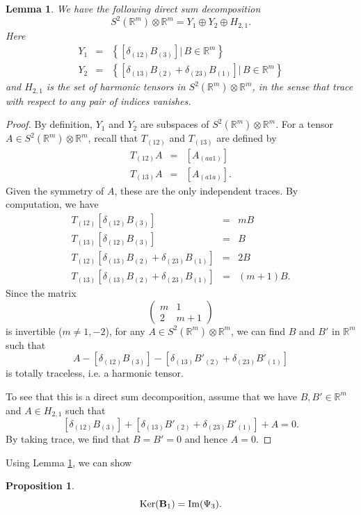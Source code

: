 \documentclass{amsart}
\newtheorem{lem}[thm]{Lemma}
\newtheorem{prop}[thm]{Proposition}
\newcommand{\set}[1]{\left\{#1\right\}}
\newcommand{\Real}{\mathbb R}
\numberwithin{equation}{section}
\begin{document}
\begin{lem}\label{lem:decom_21}
	We have the following direct sum decomposition
	\[
		S^2(\Real^m)\otimes \Real^m= Y_1 \oplus Y_2\oplus H_{2,1}.
	\]
	Here
	\begin{eqnarray*}
		Y_1&=& \set{[ \delta_{(12)}B_{(3)}] |\, B\in \Real^m}\\
		Y_2&=& \set{[\delta_{(13)}B_{(2)}+\delta_{(23)}B_{(1)}]|\, B\in \Real^m}
	\end{eqnarray*}
	and $H_{2,1}$ is the set of harmonic tensors in $S^2(\Real^m)\otimes \Real^m$, in the sense that trace with respect to any pair of indices vanishes.
\end{lem}
\begin{proof}
	By definition, $Y_1$ and $Y_2$ are subspaces of $S^2(\Real^m)\otimes \Real^m$.
	For a tensor $A\in S^2(\Real^m)\otimes \Real^m$, recall that $T_{(12)}$ and $T_{(13)}$ are defined by
	\begin{eqnarray*}
		T_{(12)}A &=& [A_{(aa1)}]  \\
		T_{(13)}A &=& [A_{(a1a)}] .
	\end{eqnarray*}
	Given the symmetry of $A$, these are the only independent traces. By computation, we have	
	\begin{eqnarray*}
		T_{(12)}[\delta_{(12)}B_{(3)}] &=& m B \\
		T_{(13)}[\delta_{(12)}B_{(3)}] &=& B \\
		T_{(12)}[\delta_{(13)}B_{(2)}+ \delta_{(23)}B_{(1)}] &=& 2B \\
		T_{(13)}[\delta_{(13)}B_{(2)}+ \delta_{(23)}B_{(1)}] &=& (m+1)B.
	\end{eqnarray*}
	Since the matrix
	\[
		\left(
			\begin{array}{cc}
				m & 1\\
				2 & m+1
			\end{array}
		\right)
	\]
	is invertible ($m\ne 1,-2$), for any $A\in S^2(\Real^m)\otimes \Real^m$, we can find $B$ and $B'$ in $\Real^m$ such that
	\[
		A- [\delta_{(12)}B_{(3)}] - [\delta_{(13)}B'_{(2)}+ \delta_{(23)}B'_{(1)}]
	\]
	is totally traceless, i.e. a harmonic tensor. 

	To see that this is a direct sum decomposition, assume that we have $B,B'\in \Real^m$ and $A\in H_{2,1}$ such that
	$$
	[\delta_{(12)}B_{(3)}] + [\delta_{(13)}B'_{(2)}+\delta_{(23)}B'_{(1)}] + A =0.
	$$
	By taking trace, we find that $B=B'=0$ and hence $A=0$.
\end{proof}
Using Lemma \ref{lem:decom_21}, we can show
\begin{prop}
	\label{prop:psi3}
	\[
		{\rm Ker}({\mathbf B}_1) = {\rm Im}(\Psi_3).
	\]
\end{prop}
\end{document}
